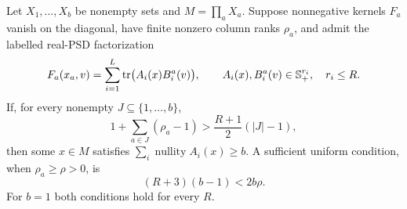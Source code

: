 \begin{theorem}\label{thm:rado-nullity}
Let $X_1,\ldots,X_b$ be nonempty sets and $M=\prod_aX_a$.
Suppose nonnegative kernels $F_a$ vanish on the diagonal, have finite
nonzero column ranks $\rho_a$, and admit the labelled real-PSD
factorization
\begin{equation}\label{eq:residual-factors}
 F_a(x_a,v)=\sum_{i=1}^L\operatorname{tr}\bigl(A_i(x)B_i^a(v)\bigr),
 \qquad A_i(x),B_i^a(v)\in\mathbb S_+^{r_i},\quad r_i\leq R.
\end{equation}
If, for every nonempty $J\subseteq\{1,\ldots,b\}$,
\begin{equation}\label{eq:rado-criterion}
 1+\sum_{a\in J}(\rho_a-1)>
                   \frac{R+1}{2}(|J|-1),
\end{equation}
then some $x\in M$ satisfies
$\sum_i\operatorname{nullity}A_i(x)\geq b$.
A sufficient uniform condition, when $\rho_a\geq\rho>0$, is
\begin{equation}\label{eq:rado-uniform}
 (R+3)(b-1)<2b\rho.
\end{equation}
For $b=1$ both conditions hold for every $R$.
\end{theorem}
